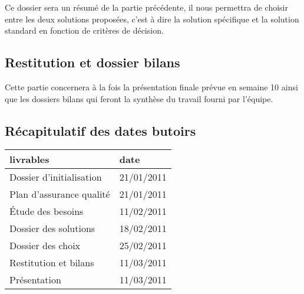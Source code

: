 Ce dossier sera un résumé de la partie précédente, il nous permettra de choisir
entre les deux solutions proposées, c'est à dire la solution spécifique et la
solution standard en fonction de critères de décision. 

\subsection{Restitution et dossier bilans}

Cette partie concernera à la fois la présentation finale prévue en semaine 10
ainsi que les dossiers bilans qui feront la synthèse du travail fourni par l'équipe.

\subsection{Récapitulatif des dates butoirs}

\begin{longtable}{|l|l|}
\hline
livrables& date\\
\endhead \hline
Dossier d'initialisation& 21/01/2011\\
\hline
Plan d'assurance qualité& 21/01/2011\\
\hline
Étude des besoins& 11/02/2011\\
\hline
Dossier des solutions& 18/02/2011\\
\hline
Dossier des choix& 25/02/2011\\
\hline
Restitution et bilans& 11/03/2011\\
\hline
Présentation&  11/03/2011\\
\hline
\end{longtable}

